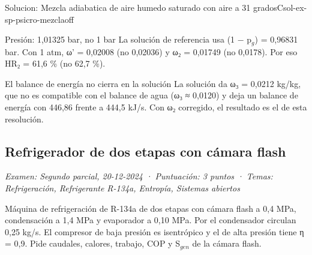 \documentclass[11pt,a4paper]{article}
\begin{document}
\begin{ocg}{Solucion: Mezcla adiabatica de aire humedo saturado con aire a 31  gradosC}{sol-ex-sp-psicro-mezcla}{off}
\begin{ojobox}{Presión: 1,01325 bar, no 1 bar}
La solución de referencia usa (1 − p$_{g}$) = 0,96831 bar. Con 1 atm, ω' = 0,02008 (no 0,02036) y ω₂ = 0,01749 (no 0,0178). Por eso HR₂ = 61,6 \% (no 62,7 \%).
\end{ojobox}

\begin{ojobox}{El balance de energía no cierra en la solución}
La solución da ω₃ = 0,0212 kg/kg, que no es compatible con el balance de agua (ω₃ ≈ 0,0120) y deja un balance de energía con 446,86 frente a 444,5 kJ/s. Con ω₂ corregido, el resultado es el de esta resolución.
\end{ojobox}

\hspace{0pt}\end{ocg}

\subsection{Refrigerador de dos etapas con cámara flash}
\noindent\textit{Examen: Segundo parcial, 20-12-2024 · Puntuación: 3 puntos · Temas: Refrigeración, Refrigerante R-134a, Entropía, Sistemas abiertos}\par\medskip

Máquina de refrigeración de R-134a de dos etapas con cámara flash a 0,4 MPa, condensación a 1,4 MPa y evaporador a 0,10 MPa. Por el condensador circulan 0,25 kg/s. El compresor de baja presión es isentrópico y el de alta presión tiene η = 0,9. Pide caudales, calores, trabajo, COP y S$_{gen}$ de la cámara flash.
\end{document}

